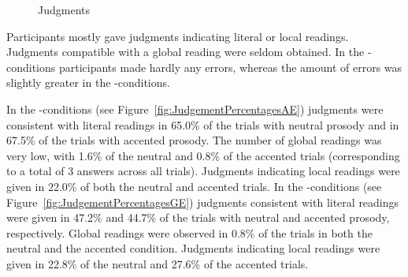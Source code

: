 \documentclass[fleqn,reqno,10pt,draft]{article}
\newcommand{\as}{\acro{as}}
\renewcommand{\es}{\acro{es}}
\begin{document}
\begin{figure}[]
{

\label{fig:JudgementPercentagesGE}
}
\caption[Optional caption for list of figures]{Judgments}
\label{fig:JudgementPercentages}
\end{figure}
%
Participants mostly gave judgments indicating literal or local
readings. Judgments compatible with a global reading were seldom
obtained. In the \as-conditions participants made hardly any errors,
whereas the amount of errors was slightly greater in the
\es-conditions.

In the \as-conditions (see Figure~\ref{fig:JudgementPercentagesAE})
judgments were consistent with literal readings in 65.0\% of the
trials with neutral prosody and in 67.5\% of the trials with accented
prosody. The number of global readings was very low,
with 1.6\% of the neutral and 0.8\% of the accented trials
(corresponding to a total of 3 answers across all trials). Judgments
indicating local readings were given in 22.0\% of both the neutral and
accented trials. In the \es-conditions (see
Figure~\ref{fig:JudgementPercentagesGE}) judgments consistent with
literal readings were given in 47.2\% and 44.7\% of the trials with
neutral and accented prosody, respectively. Global readings were
observed in 0.8\% of the trials in both the neutral and the accented
condition. Judgments indicating local readings were given in 22.8\% of
the neutral and 27.6\% of the accented trials.
\end{document}
